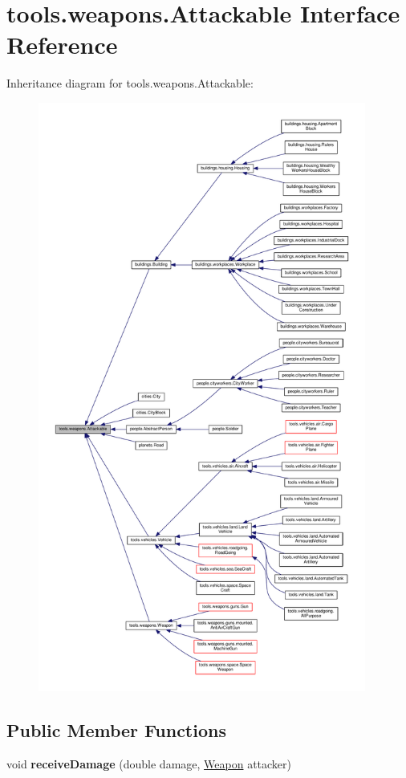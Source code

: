 \hypertarget{interfacetools_1_1weapons_1_1_attackable}{}\section{tools.\+weapons.\+Attackable Interface Reference}
\label{interfacetools_1_1weapons_1_1_attackable}


Inheritance diagram for tools.\+weapons.\+Attackable\+:\nopagebreak
\begin{figure}[H]
\begin{center}
\leavevmode
\includegraphics[height=550pt]{interfacetools_1_1weapons_1_1_attackable__inherit__graph}
\end{center}
\end{figure}
\subsection*{Public Member Functions}
\begin{DoxyCompactItemize}
\item 
void {\bfseries receive\+Damage} (double damage, \hyperlink{classtools_1_1weapons_1_1_weapon}{Weapon} attacker)\hypertarget{interfacetools_1_1weapons_1_1_attackable_a1727869e1910076f6bc00b771c7167ed}{}\label{interfacetools_1_1weapons_1_1_attackable_a1727869e1910076f6bc00b771c7167ed}

\end{DoxyCompactItemize}


